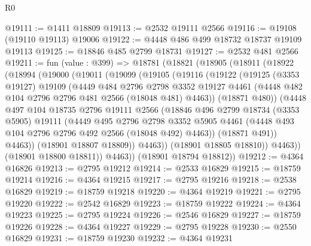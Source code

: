 \begin{lexlean}{R0}
\begin{coremodule}
@19111 := @1411 @18809
@19113 := @2532 @19111 @2566
@19116 := @19108 (@19110 @19113) @19006
@19122 := @4448 @486 @499 @18732 @18737 @19109 @19113
@19125 := @18846 @485 @2799 @18731
@19127 := @2532 @481 @2566
@19211 := fun (value : @399) =>
  @18781
    (@18821
      (@18905
        (@18911
          (@18922
            (@18994
              (@19000
                (@19011
                  (@19099
                    (@19105
                      (@19116
                        (@19122
                          (@19125
                            (@3353 @19127)
                            @19109
                            (@4449
                              @484
                              @2796
                              @2798
                              @3352
                              @19127
                              @4461
                              (@4448 @482 @104 @2796 @2796 @481 @2566 (@18048 @481) @4463))
                            (@18871 @480))
                          (@4448
                            @497
                            @104
                            @18735
                            @2796
                            @19111
                            @2566
                            (@18846
                              @496
                              @2799
                              @18734
                              (@3353 @5905)
                              @19111
                              (@4449
                                @495
                                @2796
                                @2798
                                @3352
                                @5905
                                @4461
                                (@4448 @493 @104 @2796 @2796 @492 @2566 (@18048 @492) @4463))
                              (@18871 @491))
                            @4463))
                        (@18901 @18807 @18809))
                      @4463))
                  (@18901 @18805 @18810))
                @4463))
            (@18901 @18800 @18811))
          @4463))
      (@18901 @18794 @18812))
@19212 := @4364 @16826
@19213 := @2795 @19212
@19214 := @2533 @16829
@19215 := @18759 @19214
@19216 := @4364 @19215
@19217 := @2795 @19216
@19218 := @2538 @16829
@19219 := @18759 @19218
@19220 := @4364 @19219
@19221 := @2795 @19220
@19222 := @2542 @16829
@19223 := @18759 @19222
@19224 := @4364 @19223
@19225 := @2795 @19224
@19226 := @2546 @16829
@19227 := @18759 @19226
@19228 := @4364 @19227
@19229 := @2795 @19228
@19230 := @2550 @16829
@19231 := @18759 @19230
@19232 := @4364 @19231

\end{coremodule}
\end{lexlean}

